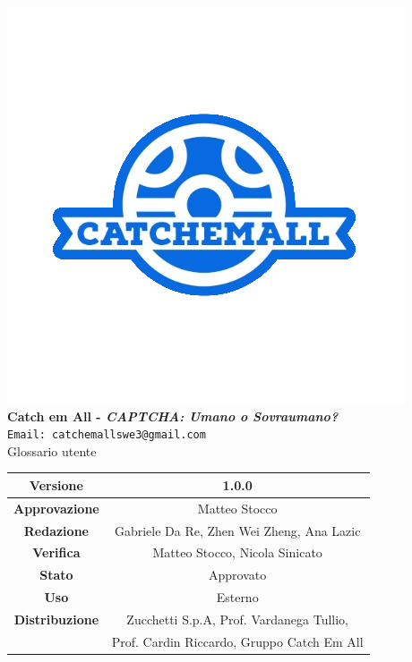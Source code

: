 \begin{titlepage}
\begin{center}
	\includegraphics[scale = 1.5]{img/logo.png}\\
	\bigskip
	\large \textbf{Catch em All - \textit{CAPTCHA: Umano o Sovraumano?}}\\
	\texttt{Email: catchemallswe3@gmail.com}\\
	\vfill
	{\fontsize{1.5cm}{0}\selectfont Glossario utente}\\
	\vfill
	\setlength\extrarowheight{5pt}
	\begin{tabularx}{\textwidth}{| c | c |}
		\hline
		\textbf{Versione} & 1.0.0\\
		\hline
		\textbf{Approvazione} & Matteo Stocco \\
		\hline
		\textbf{Redazione} & Gabriele Da Re, Zhen Wei Zheng, Ana Lazic\\
		\hline
		\textbf{Verifica} & Matteo Stocco, Nicola Sinicato\\
		\hline
		\textbf{Stato} & Approvato\\
		\hline
		\textbf{Uso} & Esterno\\
		\hline
		\textbf{Distribuzione} & Zucchetti S.p.A, Prof. Vardanega Tullio, \\
		&  Prof. Cardin Riccardo, Gruppo Catch Em All\\
		\hline
	\end{tabularx}
\end{center}
\end{titlepage} 
